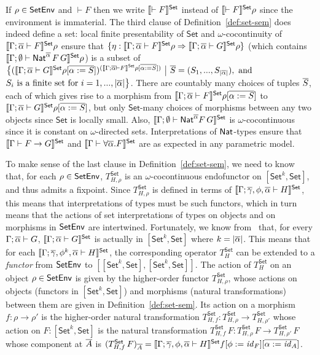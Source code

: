 \documentclass{lmcs}
\theoremstyle{plain}\newtheorem{satz}[thm]{Satz}
\newcommand{\set}{\mathsf{Set}}
\renewcommand{\id}{\mathit{id}}
\begin{document}
If $\rho \in \mathsf{SetEnv}$ and $\vdash F$ then we write $\setsem{\vdash F}$
instead of $\setsem{\vdash F}\rho$ since the environment is
immaterial. The third clause of Definition~\ref{def:set-sem} does
indeed define a set: local finite presentability of $\set$ and
$\omega$-cocontinuity of $\setsem{\Gamma;\ol{\alpha} \vdash F}\rho$
ensure that $\{\eta : \setsem{\Gamma;\ol{\alpha} \vdash F}\rho
\Rightarrow \setsem{\Gamma;\ol{\alpha} \vdash G}\rho\}$ (which
contains $\setsem{\Gamma;\emptyset \vdash
  \Nat^{\ol{\alpha}}\,F\,G}\rho$) is a subset of
$\big\{({\setsem{\Gamma;\ol{\alpha} \vdash G}\rho[\ol{\alpha :=
      S}]})^{(\setsem{\Gamma;\ol{\alpha} \vdash F}\rho[\ol{\alpha :=
      S}])}~\big|~ \ol{S} = (S_1,...,S_{|\ol{\alpha}|}), \mbox{ and }$
$S_i \mbox{ is a finite set for } i =
1,...,|\overline{\alpha}|\big\}$. There are countably many choices of tuples
$\overline{S}$, each of which gives rise to a morphism from
${\setsem{\Gamma;\ol{\alpha} \vdash F}\rho[ \ol{\alpha := S}]}$ to
${\setsem{\Gamma;\ol{\alpha} \vdash G}\rho[\ol{\alpha := S}]}$, but
only $\set$-many choices of morphisms between any two objects since
$\set$ is locally small. Also, $\setsem{\Gamma; \emptyset \vdash
  \Nat^{\ol\alpha} F\,G}$ is $\omega$-cocontinuous since it is
constant on $\omega$-directed sets. Interpretations of $\mathsf{Nat}$-types
ensure that $\setsem{\Gamma \vdash F \to G}$ and $\setsem{\Gamma
  \vdash \forall \ol\alpha. F}$ are as expected in any parametric
model.

To make sense of the last clause in Definition~\ref{def:set-sem}, we
need to know that, for each $\rho \in \mathsf{SetEnv}$, $T^\set_{H,\rho}$ is
an $\omega$-cocontinuous endofunctor on $[\set^k, \set]$, and thus
admits a fixpoint.  Since $T_{H,\rho}^\set$ is defined in terms of
$\setsem{\Gamma;\ol\gamma,\phi, \ol{\alpha} \vdash H}$, this means
that interpretations of types must be such functors, which in turn
means that the actions of set interpretations of types on objects and
on morphisms in $\mathsf{SetEnv}$ are intertwined. Fortunately, we know
from~\cite{jp19} that, for every $\Gamma; \overline{\alpha} \vdash G$,
$\setsem{\Gamma; \ol{\alpha} \vdash G}$ is actually in $[\set^k,\set]$
where $k = |\overline{\alpha}|$. This means that for each $\setsem{\Gamma;
  \ol\gamma, \phi^k, \ol{\alpha} \vdash H}$, the corresponding
operator $T^\set_{H}$ can be extended to a {\em functor} from
$\mathsf{SetEnv}$ to $[[\set^k,\set],[\set^k,\set]]$. The action of $T^\set_H$
on an object $\rho \in \mathsf{SetEnv}$ is given by the higher-order functor
$T_{H,\rho}^\set$, whose actions on objects (functors in $[\set^k,
  \set]$) and morphisms (natural transformations) between them are
given in Definition~\ref{def:set-sem}. Its action on a morphism $f :
\rho \to \rho'$ is the higher-order natural transformation
$T^\set_{H,f} : T^\set_{H,\rho} \to T^\set_{H,\rho'}$ whose action on
$F : [\set^k,\set]$ is the natural transformation $T^\set_{H,f}\, F :
T^\set_{H,\rho}\,F \to T^\set_{H,\rho'}\,F$ whose component at
$\overline{A}$ is $(T^\set_{H,f}\, F)_{\ol{A}} = \setsem{\Gamma;
  \ol\gamma,\phi,\ol{\alpha} \vdash H}f[\phi := \id_F][\ol{\alpha :=
    \id_A}]$.
\end{document}
